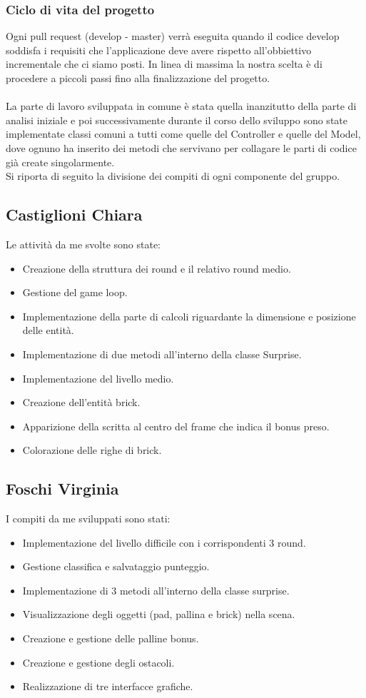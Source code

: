 \documentclass[a4paper,12pt]{report}
\begin{document}
\subsubsection{Ciclo di vita del progetto}
Ogni pull request (develop - master) verrà eseguita quando il codice develop soddisfa i requisiti che l'applicazione deve avere rispetto
all'obbiettivo incrementale che ci siamo posti.
In linea di massima la nostra scelta è di procedere a piccoli passi fino alla finalizzazione del progetto.\\
\\La parte di lavoro sviluppata in comune è stata quella inanzitutto della parte di analisi iniziale e poi successivamente durante il corso dello sviluppo
sono state implementate classi comuni a tutti come quelle del Controller e quelle del Model, dove ognuno ha inserito dei metodi che servivano per collagare
le parti di codice già create singolarmente.
\\Si riporta di seguito la divisione dei compiti di ogni componente del gruppo.
\subsection{Castiglioni Chiara}
Le attività da me svolte sono state:
\begin{itemize}
    \item Creazione della struttura dei round e il relativo round medio.
    \item Gestione del game loop.
    \item Implementazione della parte di calcoli riguardante la dimensione e posizione delle entità.
    \item Implementazione di due metodi all'interno della classe Surprise.
    \item Implementazione del livello medio.
    \item Creazione dell'entità brick.
    \item Apparizione della scritta al centro del frame che indica il bonus preso.
    \item Colorazione delle righe di brick.
\end{itemize}
\subsection{Foschi Virginia}
I compiti da me sviluppati sono stati:
\begin{itemize}
    \item Implementazione del livello difficile con i corrispondenti 3 round.
    \item Gestione classifica e salvataggio punteggio.
    \item Implementazione di 3 metodi all'interno della classe surprise.
    \item Visualizzazione degli oggetti (pad, pallina e brick) nella scena.
    \item Creazione e gestione delle palline bonus.
    \item Creazione e gestione degli ostacoli.
    \item Realizzazione di tre interfacce grafiche.
\end{itemize}
\end{document}
